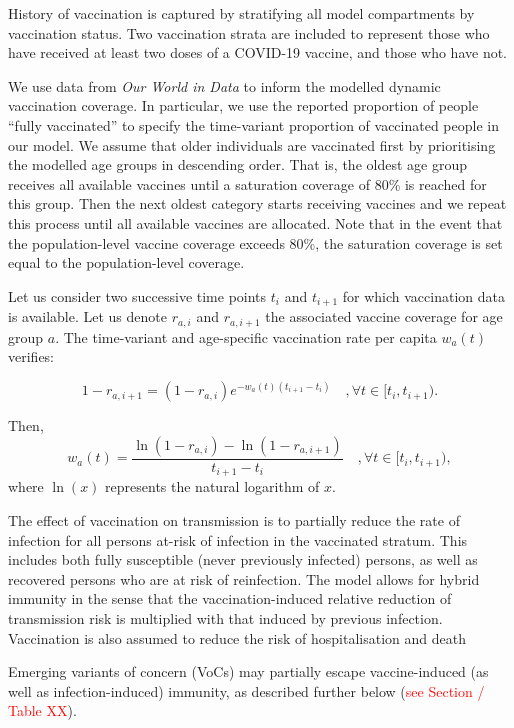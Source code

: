 
History of vaccination is captured by stratifying all model compartments by vaccination status.
Two vaccination strata are included to represent those who have received at least two doses of a COVID-19 vaccine,
and those who have not.

We use data from \textit{Our World in Data} to inform the modelled dynamic vaccination coverage. In particular, we use the reported proportion of 
people ``fully vaccinated'' to specify the time-variant proportion of vaccinated people in our model. We assume that older individuals are vaccinated 
first by prioritising the modelled age groups in descending order. That is, the oldest age group receives all available vaccines until a 
saturation coverage of 80\% is reached for this group. Then the next oldest category starts receiving vaccines and we repeat this process until all available vaccines
are allocated. Note that in the event that the population-level vaccine coverage exceeds 80\%, the saturation coverage is set equal to the population-level coverage. 

Let us consider two successive time points $t_i$ and $t_{i+1}$ for which vaccination data is available. Let us denote $r_{a, i}$ and $r_{a, i+1}$ the associated vaccine 
coverage for age group $a$. The time-variant and age-specific vaccination rate per capita $w_a(t)$ verifies:

\begin{equation}
    1 - r_{a, i+1} = (1 - r_{a, i})e^{-w_a(t)(t_{i+1} - t_i)} \quad, \forall t \in [t_i, t_{i+1}) .
\end{equation}

Then, 
\begin{equation}
    \label{eq:vacc}
    w_a(t) = \frac{\ln(1 - r_{a, i}) - \ln(1 - r_{a, i+1})}{t_{i+1} - t_i} \quad, \forall t \in [t_i, t_{i+1}) ,
\end{equation}
where $\ln(x)$ represents the natural logarithm of $x$.

The effect of vaccination on transmission is to partially reduce the rate of infection for all persons at-risk of infection in the vaccinated stratum.
This includes both fully susceptible (never previously infected) persons,
as well as recovered persons who are at risk of reinfection. The model allows for hybrid immunity
in the sense that the vaccination-induced relative reduction of transmission risk is multiplied with that induced by previous infection. Vaccination is also assumed to reduce the risk of hospitalisation and death 

Emerging variants of concern (VoCs) may partially escape vaccine-induced (as well as infection-induced) immunity, as described further below (\textcolor{red}{see Section / Table XX}).

